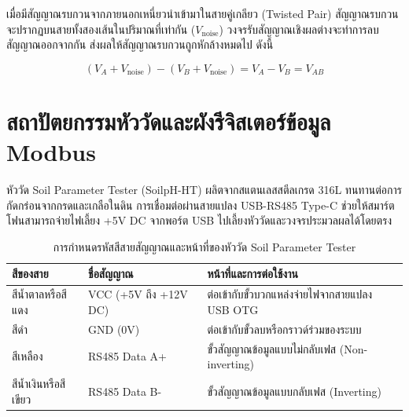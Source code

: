 เมื่อมีสัญญาณรบกวนจากภายนอกเหนี่ยวนำเข้ามาในสายคู่เกลียว (Twisted Pair) สัญญาณรบกวนจะปรากฏบนสายทั้งสองเส้นในปริมาณที่เท่ากัน ($V_{\text{noise}}$) วงจรรับสัญญาณเชิงผลต่างจะทำการลบสัญญาณออกจากกัน ส่งผลให้สัญญาณรบกวนถูกหักล้างหมดไป ดังนี้

\begin{equation}
(V_A + V_{\text{noise}}) - (V_B + V_{\text{noise}}) = V_A - V_B = V_{AB}
\end{equation}

\section{สถาปัตยกรรมหัววัดและผังรีจิสเตอร์ข้อมูล Modbus}

หัววัด Soil Parameter Tester (SoilpH-HT) ผลิตจากสแตนเลสสตีลเกรด 316L ทนทานต่อการกัดกร่อนจากกรดและเกลือในดิน การเชื่อมต่อผ่านสายแปลง USB-RS485 Type-C ช่วยให้สมาร์ตโฟนสามารถจ่ายไฟเลี้ยง +5V DC จากพอร์ต USB ไปเลี้ยงหัววัดและวงจรประมวลผลได้โดยตรง

\begin{table}[H]
\centering
\caption{การกำหนดรหัสสีสายสัญญาณและหน้าที่ของหัววัด Soil Parameter Tester}
\label{tab:wire_pinout}
\begin{tabularx}{\textwidth}{p{2.5cm}p{3.5cm}Y}
    \toprule
    \textbf{สีของสาย} & \textbf{ชื่อสัญญาณ} & \textbf{หน้าที่และการต่อใช้งาน} \\
    \midrule
    สีน้ำตาลหรือสีแดง & VCC (+5V ถึง +12V DC) & ต่อเข้ากับขั้วบวกแหล่งจ่ายไฟจากสายแปลง USB OTG \\
    สีดำ & GND (0V) & ต่อเข้ากับขั้วลบหรือกราวด์ร่วมของระบบ \\
    สีเหลือง & RS485 Data A+ & ขั้วสัญญาณข้อมูลแบบไม่กลับเฟส (Non-inverting) \\
    สีน้ำเงินหรือสีเขียว & RS485 Data B- & ขั้วสัญญาณข้อมูลแบบกลับเฟส (Inverting) \\
    \bottomrule
\end{tabularx}
\end{table}

